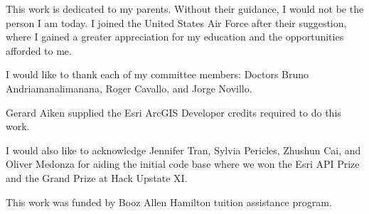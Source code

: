 \begin{acknowledgments}
This work is dedicated to my parents. Without their guidance, I would not be the person I am today. I joined the United States Air Force after their suggestion, where I gained a greater appreciation for my education and the opportunities afforded to me.

I would like to thank each of my committee members: Doctors Bruno Andriamanalimanana, Roger Cavallo, and Jorge Novillo.

Gerard Aiken supplied the Esri ArcGIS Developer credits required to do this work.

I would also like to acknowledge Jennifer Tran, Sylvia Pericles, Zhushun Cai, and Oliver Medonza for aiding the initial code base where we won the Esri API Prize and the Grand Prize at Hack Upstate XI.

This work was funded by Booz Allen Hamilton tuition assistance program.

\end{acknowledgments}
